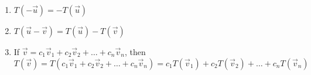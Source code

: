 \documentclass[12pt]{article}
\begin{document}
\begin{itemize}
\begin{enumerate}
          \item $T(-\overrightarrow{u})=-T(\overrightarrow{u})$

          \item $T(\overrightarrow{u}-\overrightarrow{v})=T(\overrightarrow{u})-T(\overrightarrow{v})$

          \item If $\overrightarrow{v}=c_1\overrightarrow{v}_1+c_2\overrightarrow{v}_2+\dots+c_n\overrightarrow{v}_n$, then $T(\overrightarrow{v})=T(c_1\overrightarrow{v}_1+c_2\overrightarrow{v}_2+\dots+c_n\overrightarrow{v}_n)=c_1T(\overrightarrow{v}_1)+c_2T(\overrightarrow{v}_2)+\dots+c_nT(\overrightarrow{v}_n)$

        \end{enumerate}

\end{itemize}
\end{document}
